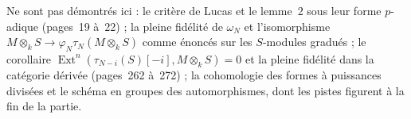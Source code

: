 Ne sont pas démontrés ici : le critère de Lucas et le lemme~2 sous leur forme $p$-adique (pages~19 à~22) ; la pleine fidélité de $\omega_N$ et l'isomorphisme $M \otimes_k S \to \varphi_N \tau_N(M \otimes_k S)$ comme énoncés sur les $S$-modules gradués ; le corollaire $\operatorname{Ext}^n(\tau_{N-i}(S)[-i], M \otimes_k S) = 0$ et la pleine fidélité dans la catégorie dérivée (pages~262 à~272) ; la cohomologie des formes à puissances divisées et le schéma en groupes des automorphismes, dont les pistes figurent à la fin de la partie.

